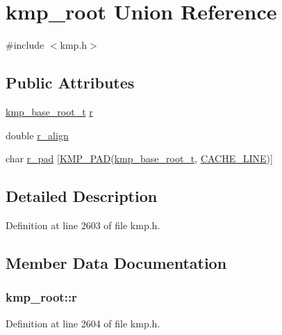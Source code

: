 \hypertarget{unionkmp__root}{\section{kmp\-\_\-root Union Reference}
\label{unionkmp__root}
}


{\ttfamily \#include $<$kmp.\-h$>$}

\subsection*{Public Attributes}
\begin{DoxyCompactItemize}
\item 
\hyperlink{kmp_8h_a59ba9484cb6d4b8e806c6632ccdbaff1}{kmp\-\_\-base\-\_\-root\-\_\-t} \hyperlink{unionkmp__root_a9e88672dfd6856a98a97d6928d22880e}{r}
\item 
double \hyperlink{unionkmp__root_ad50eea87a73ed278159ae5553d5e722e}{r\-\_\-align}
\item 
char \hyperlink{unionkmp__root_a045325ef1bf14a5e91b20236dd26227d}{r\-\_\-pad} \mbox{[}\hyperlink{kmp__lock_8h_a7e782410115489f45ab1686c39a2bb89}{K\-M\-P\-\_\-\-P\-A\-D}(\hyperlink{kmp_8h_a59ba9484cb6d4b8e806c6632ccdbaff1}{kmp\-\_\-base\-\_\-root\-\_\-t}, \hyperlink{kmp__os_8h_a86194c659a2d795e5f5949d293ae4661}{C\-A\-C\-H\-E\-\_\-\-L\-I\-N\-E})\mbox{]}
\end{DoxyCompactItemize}


\subsection{Detailed Description}


Definition at line 2603 of file kmp.\-h.



\subsection{Member Data Documentation}
\hypertarget{unionkmp__root_a9e88672dfd6856a98a97d6928d22880e}{
\subsubsection[{r}]{ kmp\-\_\-root\-::r}}\label{unionkmp__root_a9e88672dfd6856a98a97d6928d22880e}


Definition at line 2604 of file kmp.\-h.


